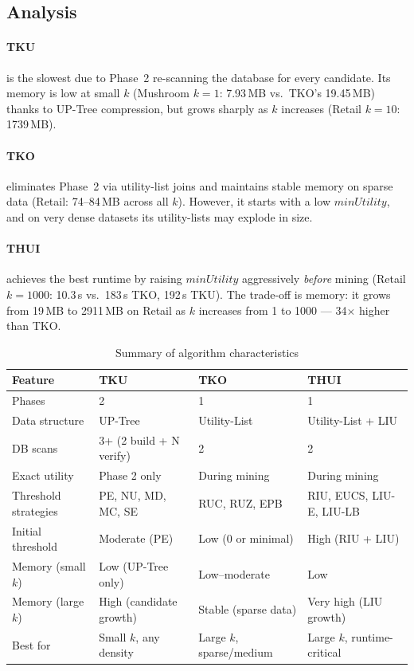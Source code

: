 \subsection{Analysis}

\paragraph{TKU} is the slowest due to Phase~2 re-scanning the database for every candidate. Its memory is low at small $k$ (Mushroom $k{=}1$: 7.93\,MB vs.\ TKO's 19.45\,MB) thanks to UP-Tree compression, but grows sharply as $k$ increases (Retail $k{=}10$: 1739\,MB).

\paragraph{TKO} eliminates Phase~2 via utility-list joins and maintains stable memory on sparse data (Retail: 74--84\,MB across all $k$). However, it starts with a low $minUtility$, and on very dense datasets its utility-lists may explode in size.

\paragraph{THUI} achieves the best runtime by raising $minUtility$ aggressively \textit{before} mining (Retail $k{=}1000$: 10.3\,s vs.\ 183\,s TKO, 192\,s TKU). The trade-off is memory: it grows from 19\,MB to 2911\,MB on Retail as $k$ increases from 1 to 1000 — 34$\times$ higher than TKO.

\begin{table}[H]
\caption{Summary of algorithm characteristics}\label{tab:summary}
\centering
\begin{tabular}{@{}llll@{}}
\toprule
\textbf{Feature} & \textbf{TKU} & \textbf{TKO} & \textbf{THUI} \\
\midrule
Phases & 2 & 1 & 1 \\
Data structure & UP-Tree & Utility-List & Utility-List + LIU \\
DB scans & 3+ (2 build + N verify) & 2 & 2 \\
Exact utility & Phase 2 only & During mining & During mining \\
Threshold strategies & PE, NU, MD, MC, SE & RUC, RUZ, EPB & RIU, EUCS, LIU-E, LIU-LB \\
Initial threshold & Moderate (PE) & Low (0 or minimal) & High (RIU + LIU) \\
Memory (small $k$) & Low (UP-Tree only) & Low--moderate & Low \\
Memory (large $k$) & High (candidate growth) & Stable (sparse data) & Very high (LIU growth) \\
Best for & Small $k$, any density & Large $k$, sparse/medium & Large $k$, runtime-critical \\
\bottomrule
\end{tabular}
\end{table}